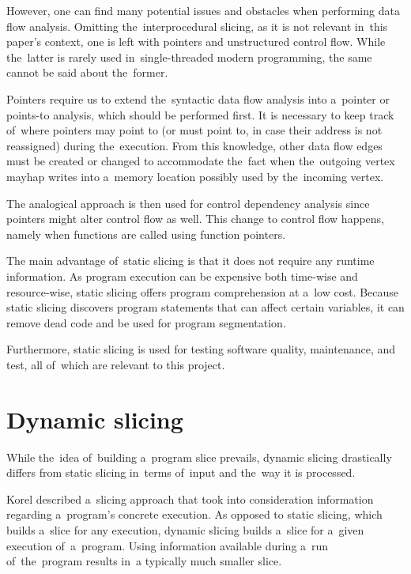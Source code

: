 However, one can find many potential issues and obstacles when performing 
data flow analysis. 
Omitting the~interprocedural slicing, as it is not relevant in~this paper's
context, one is left with pointers and unstructured control flow.
While the~latter is rarely used in~single-threaded modern programming, 
the same cannot be said about the~former. 

Pointers require us to extend the~syntactic data flow analysis 
into a~pointer or points-to analysis, which should be performed first. 
It is necessary to keep track of~where pointers may point to (or must point to,
in case their address is not reassigned) during the~execution. 
From this knowledge, other data flow edges must be created or
changed to accommodate the~fact when the~outgoing vertex mayhap writes
into a~memory location possibly used by the~incoming vertex. 

The analogical approach is then used for control dependency analysis since 
pointers might alter control flow as well. 
This change to control flow happens, namely when functions are called using 
function pointers.

The main advantage of~static slicing is that it does not require
any runtime information. 
As program execution can be expensive both time-wise and resource-wise, 
static slicing offers program comprehension at a~low cost. 
Because static slicing discovers program statements that can affect 
certain variables, it can remove dead code and be used for program segmentation. 

Furthermore, static slicing is used for testing software quality, maintenance, 
and test, all of~which are relevant to this project.

\section{Dynamic slicing}

While the~idea of~building a~program slice prevails, dynamic slicing 
drastically differs from static slicing in~terms of~input and the~way
it is processed. 

Korel \citep{Korel88} described a~slicing approach that took into 
consideration information regarding a~program's concrete execution. 
As opposed to static slicing, which builds a~slice for any execution, 
dynamic slicing builds a~slice for a~given execution of~a~program. 
Using information available during a~run of~the~program 
results in~a typically much smaller slice.

